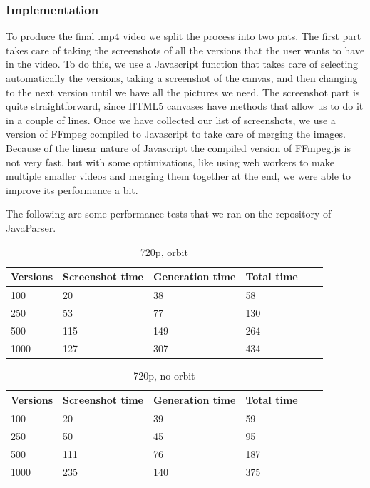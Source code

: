 \documentclass[]{usiinfbachelorproject}
\begin{document}
\subsubsection{Implementation} \label{Implementation}

To produce the final .mp4 video we split the process into two pats.
The first part takes care of taking the screenshots of all the versions that the user wants to have in the video. To do this, we use a Javascript function that takes care of selecting automatically the versions, taking a screenshot of the canvas, and then changing to the next version until we have all the pictures we need. The screenshot part is quite straightforward, since HTML5 canvases have methods that allow us to do it in a couple of lines.
Once we have collected our list of screenshots, we use a version of FFmpeg compiled to Javascript to take care of merging the images. Because of the linear nature of Javascript the compiled version of FFmpeg.js is not very fast, but with some optimizations, like using web workers to make multiple smaller videos and merging them together at the end, we were able to improve its performance a bit.

The following are some performance tests that we ran on the repository of JavaParser.

\begin{table}[H]
    \begin{center}
        \begin{tabular}{ | l | l | l | l | l | l |}
        \hline
        Versions & Screenshot time & Generation time & Total time \\ \hline
        100 & 20 & 38 & 58 \\ \hline
        250 & 53 & 77 & 130\\ \hline
        500 & 115 & 149 & 264\\ \hline
        1000 & 127 & 307 & 434 \\ \hline
        \end{tabular}
    \end{center}
    \caption{720p, orbit}
    \label{tab:performance}
\end{table}

\begin{table}[H]
    \begin{center}
        \begin{tabular}{ | l | l | l | l | l | l |}
        \hline
        Versions & Screenshot time & Generation time & Total time \\ \hline
        100 & 20 & 39 & 59 \\ \hline
        250 & 50 & 45 & 95\\ \hline
        500 & 111 & 76 & 187\\ \hline
        1000 & 235 & 140 & 375 \\ \hline
        \end{tabular}
    \end{center}
    \caption{720p, no orbit}
    \label{tab:performance}
\end{table}
\end{document}
